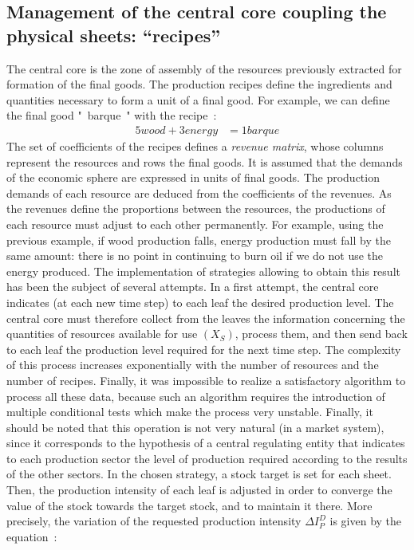 \documentclass[12pt,a4paper]{article}%
\begin{document}
\begin{appendix}
\section{Management of the central core coupling the physical sheets: ``recipes''}   
The central core is the zone of assembly of the resources previously extracted for formation of the final goods. The production recipes define the ingredients and quantities necessary to form a unit of a final good. For example, we can define the final good "~barque~" with the recipe~: 
\begin{align}
	5 wood + 3 energy &= 1 barque 
\end{align} 
The set of coefficients of the recipes defines a \textit{revenue matrix}, whose columns represent the resources and rows the final goods.  It is assumed that the demands of the economic sphere are expressed in units of final goods. The production demands of each resource are deduced from the coefficients of the revenues.  As the revenues define the proportions between the resources, the productions of each resource must adjust to each other permanently. For example, using the previous example, if wood production falls, energy production must fall by the same amount: there is no point in continuing to burn oil if we do not use the energy produced.  The implementation of strategies allowing to obtain this result has been the subject of several attempts. In a first attempt, the central core indicates (at each new time step) to each leaf the desired production level. The central core must therefore collect from the leaves the information concerning the quantities of resources available for use $(X_{S})$, process them, and then send back to each leaf the production level required for the next time step. The complexity of this process increases exponentially with the number of resources and the number of recipes. Finally, it was impossible to realize a satisfactory algorithm to process all these data, because such an algorithm requires the introduction of multiple conditional tests which make the process very unstable. Finally, it should be noted that this operation is not very natural (in a market system), since it corresponds to the hypothesis of a central regulating entity that indicates to each production sector the level of production required according to the results of the other sectors.  In the chosen strategy, a stock target is set for each sheet. Then, the production intensity of each leaf is adjusted in order to converge the value of the stock towards the target stock, and to maintain it there. More precisely, the variation of the requested production intensity $\Delta I_{P}^{D}$ is given by the equation~:

\end{appendix}
\end{document}
